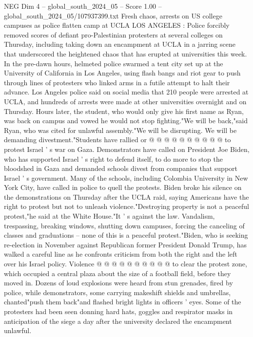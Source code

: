 \begin{textsample}{NEG Dim 4 – global\_south\_2024\_05 – Score 1.00 – global\_south\_2024\_05/107937399.txt}  \label{ex:f4_neg_258}
Fresh chaos, arrests on US college campuses as police flatten camp at UCLA LOS ANGELES : Police forcibly removed scores of defiant pro-Palestinian protesters at several colleges on Thursday, including taking down an encampment at UCLA in a jarring scene that underscored the heightened chaos that has erupted at universities this week.
In the pre-dawn hours, helmeted police swarmed a tent city set up at the University of California in Los Angeles, using flash bangs and riot gear to push through lines of protesters who linked arms in a futile attempt to halt their advance.
Los Angeles police said on social media that 210 people were arrested at UCLA, and hundreds of arrests were made at other universities overnight and on Thursday.
Hours later, the student, who would only give his first name as Ryan, was back on campus and vowed he would not stop fighting."We will be back,"said Ryan, who was cited for unlawful assembly."We will be disrupting.
We will be demanding divestment."Students have rallied or @ @ @ @ @ @ @ @ @ @ to protest Israel ' s war on Gaza.
Demonstrators have called on President Joe Biden, who has supported Israel ' s right to defend itself, to do more to stop the bloodshed in Gaza and demanded schools divest from companies that support Israel ' s government.
Many of the schools, including Colombia University in New York City, have called in police to quell the protests.
Biden broke his silence on the demonstrations on Thursday after the UCLA raid, saying Americans have the right to protest but not to unleash violence."Destroying property is not a peaceful protest,"he said at the White House."It ' s against the law.
Vandalism, trespassing, breaking windows, shutting down campuses, forcing the canceling of classes and graduations -- none of this is a peaceful protest."Biden, who is seeking re-election in November against Republican former President Donald Trump, has walked a careful line as he confronts criticism from both the right and the left over his Israel policy.
Violence @ @ @ @ @ @ @ @ @ @ to clear the protest zone, which occupied a central plaza about the size of a football field, before they moved in.
Dozens of loud explosions were heard from stun grenades, fired by police, while demonstrators, some carrying makeshift shields and umbrellas, chanted"push them back"and flashed bright lights in officers ' eyes.
Some of the protesters had been seen donning hard hats, goggles and respirator masks in anticipation of the siege a day after the university declared the encampment unlawful.

\end{textsample}
